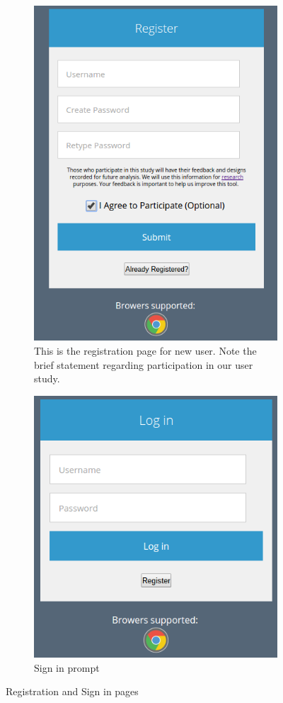 \documentclass[12pt]{article}
\begin{document}
\begin{figure}[h]

  \begin{subfigure}{.5\textwidth}
    \centering
    \includegraphics[scale=0.5]{ss_reg}
    \caption{This is the registration page for new user. Note the brief statement regarding participation in our user study.}
  \end{subfigure}%
  \begin{subfigure}{.5\textwidth}
    \centering
    \includegraphics[scale=0.5]{ss_sign}
    \caption{Sign in prompt}
  \end{subfigure}

\caption{Registration and Sign in pages}
\end{figure}
\end{document}
